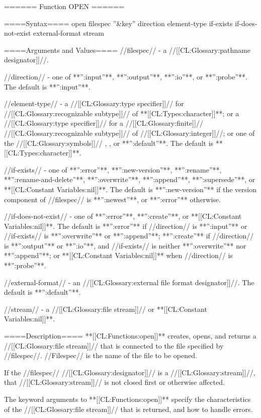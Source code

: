 ====== Function OPEN ======

====Syntax====
\DefunWithValuesNewline open {filespec ''&key'' direction element-type if-exists if-does-not-exist external-format} {stream}

====Arguments and Values====
//filespec// - a //[[CL:Glossary:pathname designator]]//.

//direction// - one of **'':input''**, **'':output''**, **'':io''**, or **'':probe''**. The default is **'':input''**.

//element-type// - a //[[CL:Glossary:type specifier]]// for //[[CL:Glossary:recognizable subtype]]// of **[[CL:Types:character]]**; or a //[[CL:Glossary:type specifier]]// for a //[[CL:Glossary:finite]]// //[[CL:Glossary:recognizable subtype]]// of //[[CL:Glossary:integer]]//; or one of the //[[CL:Glossary:symbols]]// , , or **'':default''**. The default is **[[CL:Types:character]]**.

//if-exists// - one of **'':error''**, **'':new-version''**, **'':rename''**, **'':rename-and-delete''**, **'':overwrite''**, **'':append''**, **'':supersede''**, or **[[CL:Constant Variables:nil]]**. The default is **'':new-version''** if the version component of //filespec// is **'':newest''**, or **'':error''** otherwise.

//if-does-not-exist// - one of **'':error''**, **'':create''**, or **[[CL:Constant Variables:nil]]**. The default is **'':error''** if //direction// is **'':input''** or //if-exists// is **'':overwrite''** or **'':append''**; **'':create''** if //direction// is **'':output''** or **'':io''**, and //if-exists// is neither **'':overwrite''** nor **'':append''**; or **[[CL:Constant Variables:nil]]** when //direction// is **'':probe''**.

//external-format// - an //[[CL:Glossary:external file format designator]]//. The default is **'':default''**.

//stream// - a //[[CL:Glossary:file stream]]// or **[[CL:Constant Variables:nil]]**.

====Description====
**[[CL:Functions:open]]** creates, opens, and returns a //[[CL:Glossary:file stream]]// that is connected to the file specified by //filespec//. //Filespec// is the name of the file to be opened.

If the //filespec// //[[CL:Glossary:designator]]// is a //[[CL:Glossary:stream]]//, that //[[CL:Glossary:stream]]// is not closed first or otherwise affected.

The keyword arguments to **[[CL:Functions:open]]** specify the characteristics of the //[[CL:Glossary:file stream]]// that is returned, and how to handle errors.

